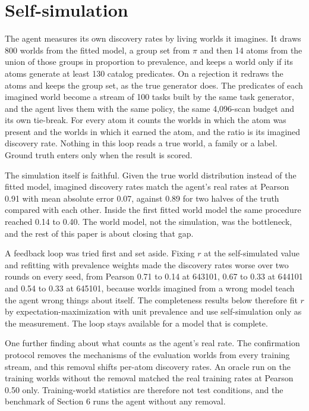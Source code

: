 \documentclass[11pt]{article}
\begin{document}
\section{Self-simulation}

The agent measures its own discovery rates by living worlds it imagines. It draws 800 worlds from the fitted model, a group set from $\pi$ and then 14 atoms from the union of those groups in proportion to prevalence, and keeps a world only if its atoms generate at least 130 catalog predicates. On a rejection it redraws the atoms and keeps the group set, as the true generator does. The predicates of each imagined world become a stream of 100 tasks built by the same task generator, and the agent lives them with the same policy, the same 4,096-scan budget and its own tie-break. For every atom it counts the worlds in which the atom was present and the worlds in which it earned the atom, and the ratio is its imagined discovery rate. Nothing in this loop reads a true world, a family or a label. Ground truth enters only when the result is scored.

The simulation itself is faithful. Given the true world distribution instead of the fitted model, imagined discovery rates match the agent's real rates at Pearson 0.91 with mean absolute error 0.07, against 0.89 for two halves of the truth compared with each other. Inside the first fitted world model the same procedure reached 0.14 to 0.40. The world model, not the simulation, was the bottleneck, and the rest of this paper is about closing that gap.

A feedback loop was tried first and set aside. Fixing $r$ at the self-simulated value and refitting with prevalence weights made the discovery rates worse over two rounds on every seed, from Pearson 0.71 to 0.14 at 643101, 0.67 to 0.33 at 644101 and 0.54 to 0.33 at 645101, because worlds imagined from a wrong model teach the agent wrong things about itself. The completeness results below therefore fit $r$ by expectation-maximization with unit prevalence and use self-simulation only as the measurement. The loop stays available for a model that is complete.

One further finding about what counts as the agent's real rate. The confirmation protocol removes the mechanisms of the evaluation worlds from every training stream, and this removal shifts per-atom discovery rates. An oracle run on the training worlds without the removal matched the real training rates at Pearson 0.50 only. Training-world statistics are therefore not test conditions, and the benchmark of Section 6 runs the agent without any removal.
\end{document}
